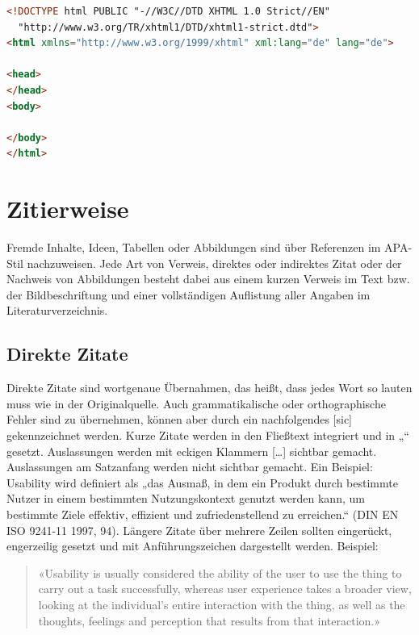 \begin{lstlisting}[language=HTML,caption={So sieht Code schön aus.},captionpos=b,label=code:arduino_blink]
<!DOCTYPE html PUBLIC "-//W3C//DTD XHTML 1.0 Strict//EN"
  "http://www.w3.org/TR/xhtml1/DTD/xhtml1-strict.dtd">
<html xmlns="http://www.w3.org/1999/xhtml" xml:lang="de" lang="de">

<head>
</head>
<body>

</body>
</html>
\end{lstlisting}


\section{Zitierweise}\label{subsec:zitierweise}

Fremde Inhalte, Ideen, Tabellen oder Abbildungen sind über Referenzen im APA-Stil nachzuweisen.
Jede Art von Verweis, direktes oder indirektes Zitat oder der Nachweis von Abbildungen besteht dabei aus einem kurzen Verweis im Text bzw. der Bildbeschriftung und einer vollständigen Auflistung aller Angaben im Literaturverzeichnis.

\subsection{Direkte Zitate}\label{subsubsec:direkte}

Direkte Zitate sind wortgenaue Übernahmen, das heißt, dass jedes Wort so lauten muss wie in der Originalquelle.
Auch grammatikalische oder orthographische Fehler sind zu übernehmen, können aber durch ein nachfolgendes [sic] gekennzeichnet werden.
Kurze Zitate werden in den Fließtext integriert und in „“ gesetzt.
Auslassungen werden mit eckigen Klammern […] sichtbar gemacht.
Auslassungen am Satzanfang werden nicht sichtbar gemacht.
Ein Beispiel: Usability wird definiert als „das Ausmaß, in dem ein Produkt durch bestimmte Nutzer in einem bestimmten Nutzungskontext genutzt werden kann, um bestimmte Ziele effektiv, effizient und zufriedenstellend zu erreichen.“ (DIN EN ISO 9241-11 1997, 94).
Längere Zitate über mehrere Zeilen sollten eingerückt, engerzeilig gesetzt und mit Anführungszeichen dargestellt werden.
Beispiel:

\begin{quote}
«Usability is usually considered the ability of the user to use the thing to carry out a task successfully, whereas user experience takes a broader view, looking at the individual’s entire interaction with the thing, as well as the thoughts, feelings and perception that results from that interaction.»
\cite[S. 4]{albert2013measuring}
\end{quote}


